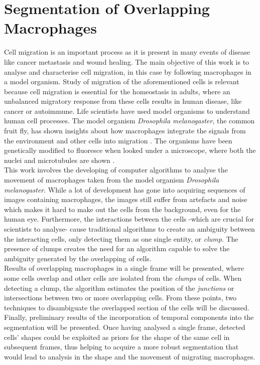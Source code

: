   \section*{Segmentation of Overlapping Macrophages}
%
Cell migration is an important process as it is present in many events of
disease like cancer metastasis and wound healing.
The main objective of this work is to analyse and characterise cell
migration, in this case by following macrophages in a model organism.
Study of migration of the aforementioned cells is relevant because
cell migration is essential for the homeostasis in adults\cite{pocha2014},
where an unbalanced migratory response from these cells results in
human disease, like cancer or autoimmune.
Life scientists have used model organisms to understand human cell processes.
The model organism \emph{Drosophila melanogaster}, the common fruit fly,
has shown insights about how macrophages integrate the signals
from the environment and other cells into migration \cite{wood2017}.
The organisms have been genetically modified to fluoresce
when looked under a microscope, where both the nuclei and
microtubules are shown \cite{Stramer2010}.
\medskip\\
%
This work involves the developing of computer algorithms to analyse the
movement of macro\-phages taken from the model organism
\emph{Drosophila melanogaster}. While a lot of development
has gone into acquiring sequences of images containing macrophages,
the images still suffer from artefacts and noise which makes it hard to
make out the cells from the background, even for the human eye.
Furthermore, the interactions between the cells
-which are crucial for scientists to analyse-
cause traditional algorithms\cite{Henry2013,lu2015,Caselles}
to create an ambiguity between the interacting cells, only detecting them
as one single entity, or \emph{clump}.
The presence of clumps creates the need for an algorithm capable to solve
the ambiguity generated by the overlapping of cells.
\medskip\\
%
Results of overlapping macrophages in a single frame will be
presented, where some cells overlap and other cells are
isolated from the \emph{clumps} of cells. When detecting a clump,
the algorithm estimates the position of the \emph{junctions} or intersections
between two or more overlapping cells. From these points, two techniques
to disambiguate the overlapped section of the cells will be discussed.
Finally, preliminary results of the incorporation of temporal components
into the segmentation will be presented. Once having analysed a single
frame, detected cells' shapes could be exploited as priors for the
shape of the same cell in subsequent frames, thus helping to acquire a
more robust segmentation that would lead to analysis in the shape and the
movement of migrating macrophages.
